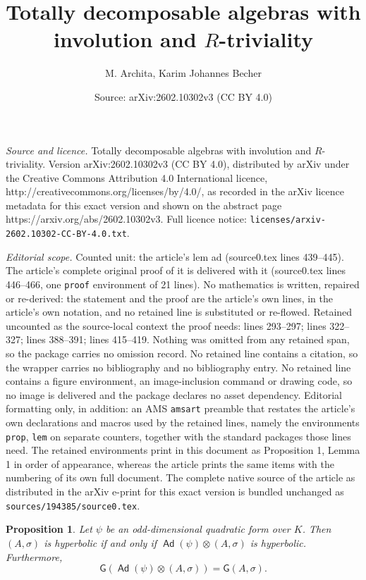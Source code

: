 \documentclass[10pt,a4paper]{amsart}
\title{Totally decomposable algebras with involution and \texorpdfstring{$R$}{R}-triviality}
\author{M. Archita, Karim Johannes Becher}
\date{Source: arXiv:2602.10302v3 (CC BY 4.0)}
\newtheorem{prop}{Proposition}
\newcommand\Ad{\operatorname{\mathsf{Ad}}}
\newcommand{\G}{\mathsf{G}}
\newcommand{\s}{\sigma}
\begin{document}
\maketitle

\noindent\emph{Source and licence.} Totally decomposable algebras with involution and \texorpdfstring{$R$}{R}-triviality. Version arXiv:2602.10302v3 (CC BY 4.0), distributed by arXiv under the Creative Commons Attribution 4.0 International licence, http://creativecommons.org/licenses/by/4.0/, as recorded in the arXiv licence metadata for this exact version and shown on the abstract page https://arxiv.org/abs/2602.10302v3. Full licence notice: \texttt{licenses/arxiv-2602.10302-CC-BY-4.0.txt}.\par\smallskip

\noindent\textit{Editorial scope.} Counted unit: the article's lem ad (source0.tex lines 439--445). The article's complete original proof of it is delivered with it (source0.tex lines 446--466, one \texttt{proof} environment of 21 lines). No mathematics is written, repaired or re-derived: the statement and the proof are the article's own lines, in the article's own notation, and no retained line is substituted or re-flowed.  Retained uncounted as the source-local context the proof needs: lines 293--297; lines 322--327; lines 388--391; lines 415--419.  Nothing was omitted from any retained span, so the package carries no omission record.  No retained line contains a citation, so the wrapper carries no bibliography and no bibliography entry.  No retained line contains a figure environment, an image-inclusion command or drawing code, so no image is delivered and the package declares no asset dependency.  Editorial formatting only, in addition: an AMS \texttt{amsart} preamble that restates the article's own declarations and macros used by the retained lines, namely the environments \texttt{prop}, \texttt{lem} on separate counters, together with the standard packages those lines need.  The retained environments print in this document as Proposition 1, Lemma 1 in order of appearance, whereas the article prints the same items with the numbering of its own full document.  The complete native source of the article as distributed in the arXiv e-print for this exact version is bundled unchanged as \texttt{sources/194385/source0.tex}.
\begin{prop}\label{odddimnonzerodiv}
Let $\psi$ be an odd-dimensional quadratic form over $K$.
Then $(A,\s)$ is hyperbolic if and only if $\Ad(\psi)\otimes(A,\s)$ is hyperbolic. 
Furthermore, $$\G(\Ad(\psi)\otimes (A,\s))=\G(A,\s).$$
\end{prop}
\end{document}
